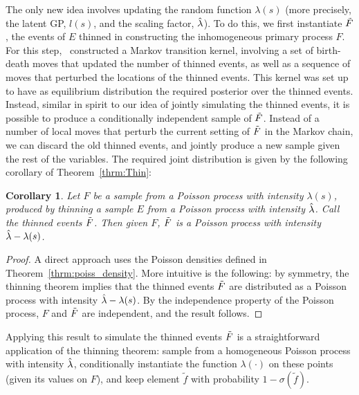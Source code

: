 \documentclass{statsoc}
\newtheorem{coro}[defn]{Corollary}
\begin{document}
The only new idea 
involves updating the random function $\lambda(s)$ (more precisely, the latent GP, $l(s)$, and the scaling factor, $\hat{\lambda}$). 
To do this, we first instantiate $\tilde{F}$, the events of $E$ thinned in constructing the inhomogeneous primary process $F$.
For this step,~\citet{adams-murray-mackay-2009b} constructed a Markov transition kernel, involving a set of birth-death moves that updated the number of thinned 
events, as
well as a sequence of moves that perturbed the locations of the thinned events. This kernel was set up to have as equilibrium distribution the required
posterior over the thinned events. 
Instead, similar in spirit to our idea of jointly simulating the thinned \matern events, it is possible to produce a conditionally independent sample of $\tilde{F}$.
Instead of a number of local moves that perturb the current setting of $\tilde{F}$ in the Markov chain, we can discard the old thinned
events, and jointly produce a new sample given the rest of the variables. 
The required joint distribution is given by the following corollary of Theorem~\ref{thrm:Thin}:
\begin{coro} \label{prop:thin_post} Let $F$ be a sample from a Poisson process with intensity $\lambda(s)$, produced
by thinning a sample $E$ from a Poisson process with intensity $\hat{\lambda}$. Call the thinned events $\tilde{F}$. Then given $F$, $\tilde{F}$ is a 
Poisson process with intensity $\hat{\lambda} - \lambda(s)$.
\end{coro}
\begin{proof}
A direct approach uses the Poisson densities defined in Theorem~\ref{thrm:poiss_density}. More intuitive is the following: by symmetry, the
thinning theorem implies that the thinned events $\tilde{F}$ are distributed as a Poisson process with intensity $\hat{\lambda} - \lambda(s)$. By the
independence property of the Poisson process, $F$ and $\tilde{F}$ are independent, and the result follows.
\end{proof}
Applying this result to simulate the thinned events $\tilde{F}$ is a straightforward application of the thinning theorem: 
sample from a homogeneous Poisson process with intensity $\hat{\lambda}$, conditionally instantiate the function $\lambda(\cdot)$ on these points (given its values on $F$), 
and keep element $\tilde{f}$ with probability $1 - \sigma(\tilde{f})$. 
\end{document}
